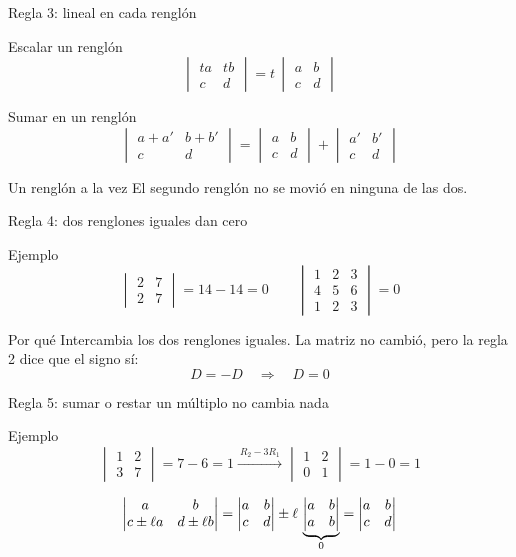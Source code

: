 \documentclass[aspectratio=169,11pt]{beamer}
\newcommand{\dbar}[1]{%
  \begin{vmatrix} #1 \end{vmatrix}%
}
\begin{document}
\begin{frame}{Regla 3: lineal en cada renglón}
  \begin{block}{Escalar un renglón}
    \[
      \dbar{ta & tb \\ c & d} = t\,\dbar{a & b \\ c & d}
    \]
  \end{block}

  \begin{block}{Sumar en un renglón}
    \[
      \dbar{a + a' & b + b' \\ c & d}
      = \dbar{a & b \\ c & d} + \dbar{a' & b' \\ c & d}
    \]
  \end{block}

  \begin{alertblock}{Un renglón a la vez}
    El segundo renglón no se movió en ninguna de las dos.
  \end{alertblock}
\end{frame}

\begin{frame}{Regla 4: dos renglones iguales dan cero}
  \begin{block}{Ejemplo}
    \[
      \dbar{2 & 7 \\ 2 & 7} = 14 - 14 = 0
      \qquad
      \dbar{1 & 2 & 3 \\ 4 & 5 & 6 \\ 1 & 2 & 3} = 0
    \]
  \end{block}

  \begin{block}{Por qué}
    Intercambia los dos renglones iguales. La matriz no cambió, pero
    la regla 2 dice que el signo sí:
    \[
      D = -D
      \quad\Longrightarrow\quad
      D = 0
    \]
  \end{block}
\end{frame}

\begin{frame}{Regla 5: sumar o restar un múltiplo no cambia nada}
  \begin{block}{Ejemplo}
    \[
      \dbar{1 & 2 \\ 3 & 7} = 7 - 6 = 1
      \xrightarrow{\ R_2 - 3R_1\ }
      \dbar{1 & 2 \\ 0 & 1} = 1 - 0 = 1
    \]
  \end{block}

  \[
    \dbar{a & b \\ c \pm \ell a & d \pm \ell b}
    = \dbar{a & b \\ c & d}
      \pm \ell\,\underbrace{\dbar{a & b \\ a & b}}_{0}
    = \dbar{a & b \\ c & d}
  \]


\end{frame}
\end{document}

